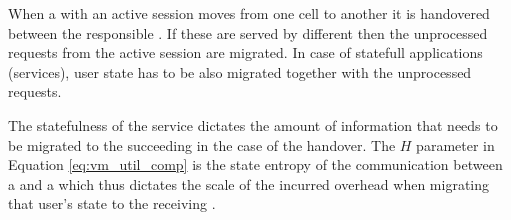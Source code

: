 


When a \ue{} with an active session moves from one cell to another it is handovered between the responsible \rbss{}.
If these \rbss{} are served by different \dcs{} then the unprocessed requests from the active session are migrated.
In case of statefull applications (services), user state has to be also migrated together with the unprocessed requests.

The statefulness of the service dictates the amount of information that needs to be migrated to the succeeding \dc{} in the case of the \ue{} handover.
The $H$ parameter in Equation \ref{eq:vm_util_comp} is the state entropy of the communication between a \ue{} and a \dc{} which thus dictates the scale of the incurred overhead when migrating that user's state  to the receiving \dc{}.